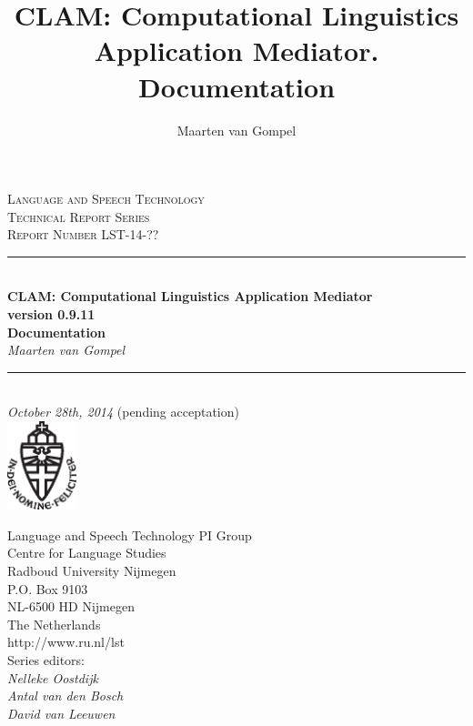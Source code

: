 \documentclass[a4paper,12pt]{report}
\author{Maarten van Gompel}
\title{CLAM: Computational Linguistics Application Mediator. Documentation}
\newcommand{\HRule}{\rule{\linewidth}{0.5mm}} %
\begin{document}
\sffamily

\begin{titlepage}
\begin{center}
\textsc{\large Language and Speech Technology\\ Technical Report Series}\\[1.5cm] 
\textsc{Report Number LST-14-??}\\[0.5cm] 

\HRule \\[0.5cm]
{ \Large \bfseries CLAM: Computational Linguistics Application Mediator}\\[0.5cm] %
{\bf \small version 0.9.11} \\[0.5cm]
{ \Large \bfseries Documentation}\\[0.5cm]
{\large \emph{Maarten van Gompel}}\\[0.5cm]
\HRule \\[1.0cm]

\emph{October 28th, 2014} \small{(pending acceptation)} \\[0.5cm] 
\includegraphics[width=20.0mm]{ru-beeldmerk-zwart.eps}
\end{center}

\begin{minipage}{0.6\textwidth}
\begin{flushleft}
Language and Speech Technology PI Group \\
Centre for Language Studies \\
Radboud University Nijmegen \\
P.O. Box 9103 \\
NL-6500 HD Nijmegen \\
The Netherlands \\
http://www.ru.nl/lst \\[0.3cm]
Series editors: \\
\hspace{0.5cm}\emph{Nelleke Oostdijk}   \\
\hspace{0.5cm}\emph{Antal van den Bosch}  \\
\hspace{0.5cm}\emph{David van Leeuwen}  \\
\end{flushleft}
\end{minipage}

\end{titlepage}
\tableofcontents
\end{document}
